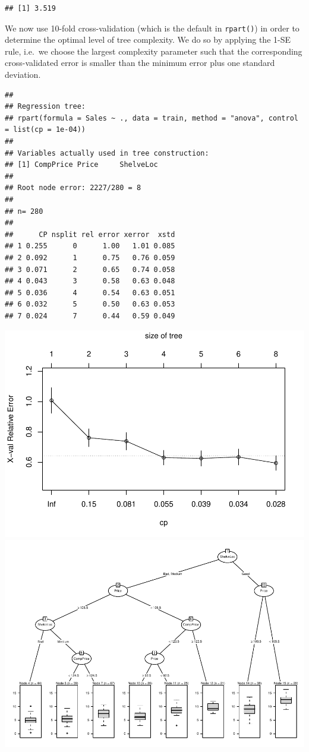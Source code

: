 \documentclass[
]{article}
\begin{document}
\begin{verbatim}
## [1] 3.519
\end{verbatim}

We now use 10-fold cross-validation (which is the default in
\texttt{rpart()}) in order to determine the optimal level of tree
complexity. We do so by applying the 1-SE rule, i.e.~we choose the
largest complexity parameter such that the corresponding cross-validated
error is smaller than the minimum error plus one standard deviation.

\begin{verbatim}
## 
## Regression tree:
## rpart(formula = Sales ~ ., data = train, method = "anova", control = list(cp = 1e-04))
## 
## Variables actually used in tree construction:
## [1] CompPrice Price     ShelveLoc
## 
## Root node error: 2227/280 = 8
## 
## n= 280 
## 
##      CP nsplit rel error xerror  xstd
## 1 0.255      0      1.00   1.01 0.085
## 2 0.092      1      0.75   0.76 0.059
## 3 0.071      2      0.65   0.74 0.058
## 4 0.043      3      0.58   0.63 0.048
## 5 0.036      4      0.54   0.63 0.051
## 6 0.032      5      0.50   0.63 0.053
## 7 0.024      7      0.44   0.59 0.049
\end{verbatim}

\includegraphics{A3_files/figure-latex/unnamed-chunk-8-1.pdf}
\includegraphics{A3_files/figure-latex/unnamed-chunk-8-2.pdf}
\end{document}
